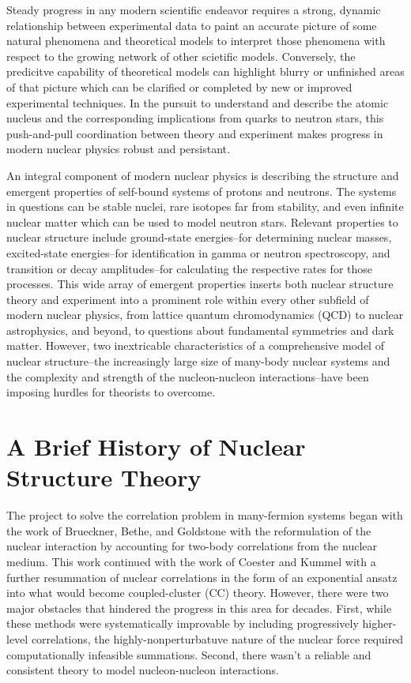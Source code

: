 \documentclass[../thesis.tex]{subfiles}
\begin{document}
Steady progress in any modern scientific endeavor requires a strong, dynamic relationship between experimental data to paint an accurate picture of some natural phenomena and theoretical models to interpret those phenomena with respect to the growing network of other scietific models. Conversely, the predicitve capability of theoretical models can highlight blurry or unfinished areas of that picture which can be clarified or completed by new or improved experimental techniques. In the pursuit to understand and describe the atomic nucleus and the corresponding implications from quarks to neutron stars, this push-and-pull coordination between theory and experiment makes progress in modern nuclear physics robust and persistant.

An integral component of modern nuclear physics is describing the structure and emergent properties of self-bound systems of protons and neutrons. The systems in questions can be stable nuclei, rare isotopes far from stability, and even infinite nuclear matter which can be used to model neutron stars. Relevant properties to nuclear structure include ground-state energies--for determining nuclear masses, excited-state energies--for identification in gamma or neutron spectroscopy, and transition or decay amplitudes--for calculating the respective rates for those processes. This wide array of emergent properties inserts both nuclear structure theory and experiment into a prominent role within every other subfield of modern nuclear physics, from lattice quantum chromodynamics (QCD) to nuclear astrophysics, and beyond, to questions about fundamental symmetries and dark matter.  However, two inextricable characteristics of a comprehensive model of nuclear structure--the increasingly large size of many-body nuclear systems and the complexity and strength of the nucleon-nucleon interactions--have been imposing hurdles for theorists to overcome. 



\section{A Brief History of Nuclear Structure Theory}

The project to solve the correlation problem in many-fermion systems began with the work of Brueckner, Bethe, and Goldstone \cite{BRUECKNER19551344,BETHE19561353,GOLDSTONE1957267} with the reformulation of the nuclear interaction by accounting for two-body correlations from the nuclear medium.  This work continued with the work of Coester and Kummel \cite{COESTER1958421,COESTER1960477,KUMMEL19781} with a further resummation of nuclear correlations in the form of an exponential ansatz into what would become coupled-cluster (CC) theory.  However, there were two major obstacles that hindered the progress in this area for decades.  First, while these methods were systematically improvable by including progressively higher-level correlations, the highly-nonperturbatuve nature of the nuclear force required computationally infeasible summations.  Second, there wasn't a reliable and consistent theory to model nucleon-nucleon interactions.
\end{document}
